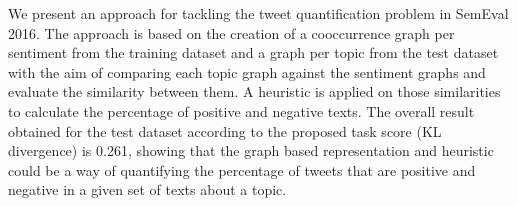 We present an approach for tackling the tweet quantification problem in SemEval 2016. The approach is based on the creation of a cooccurrence graph per sentiment from the training dataset and a graph per topic from the test dataset with the aim of comparing each topic graph against the sentiment graphs and evaluate the similarity between them. A heuristic is applied on those similarities to calculate the percentage of positive and negative texts. The overall result obtained for the test dataset according to the proposed task score (KL divergence) is 0.261, showing that the graph based representation and heuristic could be a way of quantifying the percentage of tweets that are positive and negative in a given set of texts about a topic.
